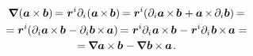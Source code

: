 \begin{otherlanguage}{russian}
\nopagebreak\vspace{-0.4em}\begin{multline}\label{gradientofcrossproductoftwovectors}
\boldnabla \hspace{-0.2ex} \left( \bm{a} \hspace{-0.1ex} \times \hspace{-0.1ex} \bm{b} \right) \hspace{-0.2ex}
= \hspace{.1ex} \bm{r}^i \partial_i \hspace{-0.3ex} \left( \bm{a} \hspace{-0.2ex} \times \hspace{-0.2ex} \bm{b} \right) \hspace{-0.2ex}
= \bm{r}^i \hspace{-0.4ex} \left( \partial_i \bm{a} \hspace{-0.2ex} \times \hspace{-0.2ex} \bm{b} \hspace{.1ex} +
\bm{a} \hspace{-0.2ex} \times \hspace{-0.2ex} \partial_i \bm{b} \right) \hspace{-0.2ex} =
\\[-0.1em]
%
= \bm{r}^i \hspace{-0.4ex} \left( \partial_i \bm{a} \hspace{-0.2ex} \times \hspace{-0.2ex} \bm{b} \hspace{.1ex} -
\partial_i \bm{b} \hspace{-0.2ex} \times \hspace{-0.2ex} \bm{a} \right) \hspace{-0.2ex}
= \hspace{.1ex} \bm{r}^i \partial_i \hspace{.1ex} \bm{a} \hspace{-0.2ex} \times \hspace{-0.2ex} \bm{b} \hspace{.1ex} - \hspace{.1ex}
\bm{r}^i \partial_i \hspace{.1ex} \bm{b} \hspace{-0.2ex} \times \hspace{-0.2ex} \bm{a} =
\\[-0.1em]
%
= \hspace{-0.12ex} \boldnabla \bm{a} \hspace{-0.1ex} \times \hspace{-0.1ex} \bm{b} \hspace{.12ex} - \hspace{-0.12ex}
\boldnabla \hspace{.1ex} \bm{b} \hspace{-0.1ex} \times \hspace{-0.1ex} \bm{a}
\hspace{.2ex} .
\end{multline}


\end{otherlanguage}
